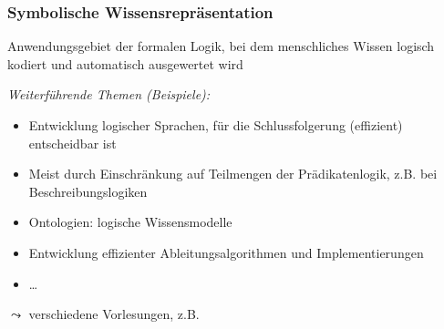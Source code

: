 \documentclass[aspectratio=1610,onlymath]{beamer}
\begin{document}
% 
% 
% 
% 
% 
% 
% 

\begin{frame}\frametitle{Symbolische Wissensrepräsentation}

Anwendungsgebiet der formalen Logik, bei dem menschliches Wissen logisch kodiert und automatisch ausgewertet wird
\bigskip

\emph{Weiterführende Themen (Beispiele):}
\begin{itemize}
\item Entwicklung logischer Sprachen, für die Schlussfolgerung (effizient) entscheidbar ist
\item Meist durch Einschränkung auf Teilmengen der Prädikatenlogik, z.B. bei Beschreibungslogiken
\item Ontologien: logische Wissensmodelle
\item Entwicklung effizienter Ableitungsalgorithmen und Implementierungen
\item \ldots
\end{itemize}

$\leadsto$ verschiedene Vorlesungen, z.B. 

\end{frame}
\end{document}
